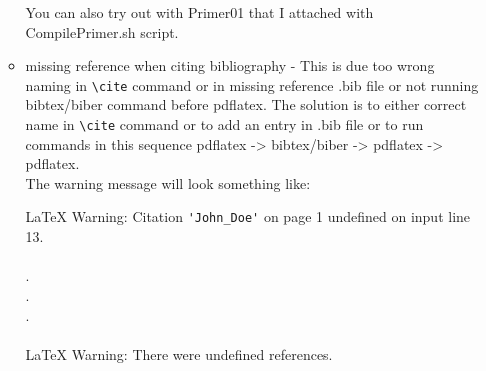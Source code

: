 \documentclass[a4paper,oneside,8pt]{extarticle}
\begin{document}
\begin{enumerate}
\begin{itemize}
                  You can also try out with Primer01 that I attached with CompilePrimer.sh script.


            \item missing reference when citing bibliography - This is due too wrong naming in \verb|\cite| command or in missing reference .bib file or not running bibtex/biber command before pdflatex. The solution is to either correct name in \verb|\cite| command or to add an entry in .bib file or to run commands in this sequence pdflatex -> bibtex/biber -> pdflatex -> pdflatex.\\
            The warning message will look something like:\\
            \begin{markdown-block}
                LaTeX Warning: Citation \verb|'John_Doe'| on page 1 undefined on input line 13.\\
                \\
                .\\
                .\\
                .\\
                \\
                LaTeX Warning: There were undefined references.\\
                \\


\end{markdown-block}
\end{itemize}
\end{enumerate}
\end{document}
